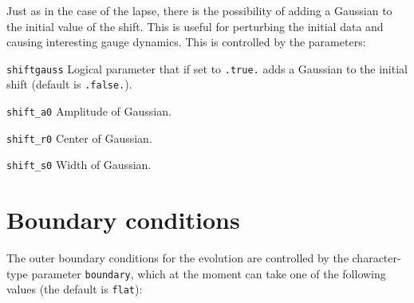 \documentclass[12pt]{article}
\begin{document}
Just as in the case of the lapse, there is the possibility of adding a
Gaussian to the initial value of the shift. This is useful for
perturbing the initial data and causing interesting gauge dynamics.
This is controlled by the parameters:

\begin{list}{}{
\setlength{\leftmargin}{35mm}
\setlength{\labelsep}{10mm}
\setlength{\labelwidth}{20mm}}

\item[\texttt{shiftgauss}] Logical parameter that if set to
  \texttt{.true.} adds a Gaussian to the initial shift (default is
  \texttt{.false.}).

\item[\texttt{shift\_a0}] Amplitude of Gaussian.

\item[\texttt{shift\_r0}] Center of Gaussian.

\item[\texttt{shift\_s0}] Width of Gaussian.

\end{list}

\vspace{3mm}



\setcounter{equation}{0}
\section{Boundary conditions}
\label{sec:boundary}

The outer boundary conditions for the evolution are controlled by the
character-type parameter \texttt{boundary}, which at the moment can
take one of the following values (the default is \texttt{flat}):
\end{document}
